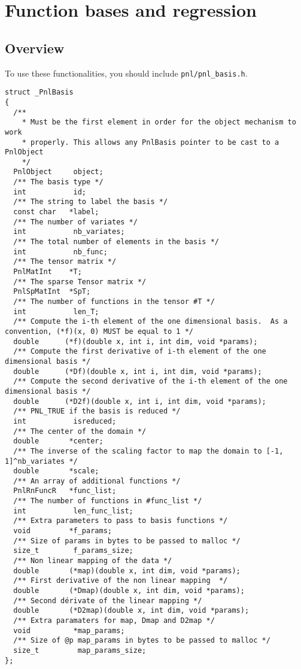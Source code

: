 \section{Function bases and regression}
\subsection{Overview}

To use these functionalities, you should include \verb!pnl/pnl_basis.h!.

\begin{lstlisting}
struct _PnlBasis
{
  /**
    * Must be the first element in order for the object mechanism to work
    * properly. This allows any PnlBasis pointer to be cast to a PnlObject
    */
  PnlObject     object;
  /** The basis type */
  int           id;
  /** The string to label the basis */
  const char   *label;
  /** The number of variates */
  int           nb_variates;
  /** The total number of elements in the basis */
  int           nb_func;
  /** The tensor matrix */
  PnlMatInt    *T;
  /** The sparse Tensor matrix */
  PnlSpMatInt  *SpT;
  /** The number of functions in the tensor #T */
  int           len_T;
  /** Compute the i-th element of the one dimensional basis.  As a convention, (*f)(x, 0) MUST be equal to 1 */
  double      (*f)(double x, int i, int dim, void *params);
  /** Compute the first derivative of i-th element of the one dimensional basis */
  double      (*Df)(double x, int i, int dim, void *params);
  /** Compute the second derivative of the i-th element of the one dimensional basis */
  double      (*D2f)(double x, int i, int dim, void *params);
  /** PNL_TRUE if the basis is reduced */
  int           isreduced;
  /** The center of the domain */
  double       *center;
  /** The inverse of the scaling factor to map the domain to [-1, 1]^nb_variates */
  double       *scale;
  /** An array of additional functions */
  PnlRnFuncR   *func_list;
  /** The number of functions in #func_list */
  int           len_func_list;
  /** Extra parameters to pass to basis functions */
  void         *f_params;
  /** Size of params in bytes to be passed to malloc */
  size_t        f_params_size;
  /** Non linear mapping of the data */
  double       (*map)(double x, int dim, void *params);
  /** First derivative of the non linear mapping  */
  double       (*Dmap)(double x, int dim, void *params);
  /** Second dérivate of the linear mapping */
  double       (*D2map)(double x, int dim, void *params);
  /** Extra paramaters for map, Dmap and D2map */
  void          *map_params;
  /** Size of @p map_params in bytes to be passed to malloc */
  size_t         map_params_size;
};
\end{lstlisting}

